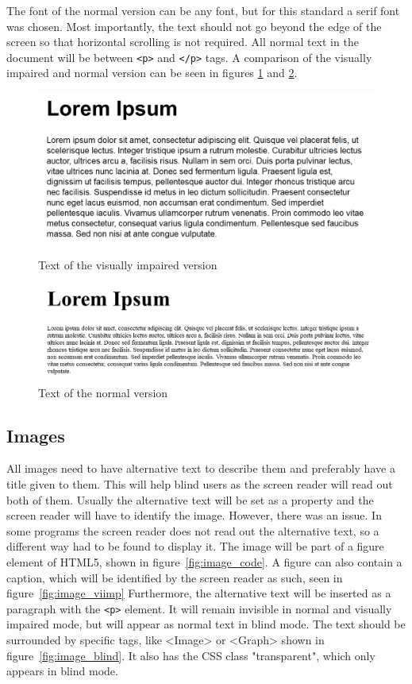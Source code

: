 The font of the normal version can be any font, but for this standard a serif font was chosen. Most importantly, the text should not go beyond the edge of the screen so that horizontal scrolling is not required. All normal text in the document will be between \lstinline|<p>| and \lstinline|</p>| tags. A comparison of the visually impaired and normal version can be seen in figures \ref{fig:viText} and \ref{fig:nText}. 

\begin{figure}
	\includegraphics[width=\linewidth]{figures/VItext.png}	
	\caption{Text of the visually impaired version}
	\label{fig:viText}
\end{figure}

\begin{figure}
	\includegraphics[width=\linewidth]{figures/Ntext.png}	
	\caption{Text of the normal version}
	\label{fig:nText}
\end{figure}

\subsection{Images}

All images need to have alternative text to describe them and preferably have a title given to them. This will help blind users as the screen reader will read out both of them. Usually the alternative text will be set as a property and the screen reader will have to identify the image. However, there was an issue. In some programs the screen reader does not read out the alternative text, so a different way had to be found to display it. The image will be part of a figure element of HTML5, shown in figure~\ref{fig:image_code}. A figure can also contain a caption, which will be identified by the screen reader as such, seen in  figure~\ref{fig:image_viimp} Furthermore, the alternative text will be inserted as a paragraph with the \lstinline|<p>| element. It will remain invisible in normal and visually impaired mode, but will appear as normal text in blind mode. The text should be surrounded by specific tags, like <Image> or <Graph> shown in figure~\ref{fig:image_blind}. It also has the CSS class "transparent", which only appears in blind mode.

